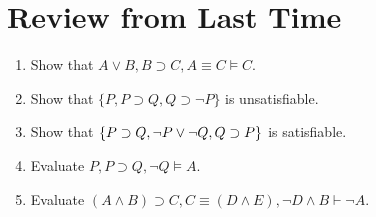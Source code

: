\documentclass[a4paper, 11pt]{article} %
\begin{document}
\begin{earg}
\end{earg}






\section*{Review from Last Time}

\begin{enumerate}
  \item Show that $A \vee B, B \supset C, A \equiv C \vDash C$.
  \item Show that $\{P, P \supset Q, Q \supset \neg P\}$ is unsatisfiable. 
  \item Show that $\lbrace P \supset Q, \neg P \vee \neg Q, Q \supset P\rbrace$ is satisfiable.
  \item Evaluate $P, P \supset Q, \neg Q \vDash A$.
  \item Evaluate $(A \wedge B) \supset C, C \equiv (D \wedge E), \neg D \wedge B \vdash \neg A$.
\end{enumerate}
\end{document}
